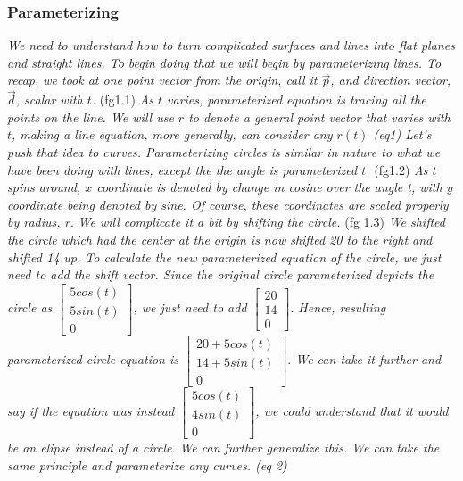 \documentclass[addpoints]{exam}
\begin{document}
\subsubsection{
Parameterizing
}
\textit{
We need to understand how to turn complicated surfaces and lines into flat planes and straight lines.
To begin doing that we will begin by parameterizing lines. 
To recap, we took at one point vector from the origin, call it $\vec{p}$, and direction vector, $\vec{d}$, scalar with $t$. 
}
(fg1.1)
\textit{
As $t$ varies, parameterized equation is tracing all the points on the line. We will use $r$ to denote a general point vector that varies with $t$, making a line equation, more generally, can consider any $r(t)$ (eq1)
Let's push that idea to curves. Parameterizing circles is similar in nature to what we have been doing with lines, except the the angle is parameterized $t$.}
(fg1.2)
\textit{
As $t$ spins around, $x$ coordinate is denoted by change in cosine over the angle t, with $y$ coordinate being denoted by sine. Of course, these coordinates are scaled properly by radius, $r.$
}
\textit{
We will complicate it a bit by shifting the circle. 
}
(fg 1.3)
\textit{
We shifted the circle which had the center at the origin is now shifted 20 to the right and shifted 14 up. To calculate the new parameterized equation of the circle, we just need to add the shift vector. Since the original circle parameterized depicts the circle as $\begin{bmatrix}
    5cos(t)\\5sin(t)\\0
\end{bmatrix}$, we just need to add $\begin{bmatrix}
    20\\14\\0
\end{bmatrix}.$ Hence, resulting parameterized circle equation is $\begin{bmatrix}
    20+5cos(t)\\
    14+5sin(t)\\
    0
\end{bmatrix}.$ We can take it further and say if the equation was instead $\begin{bmatrix}
    5cos(t)\\4sin(t)\\0
\end{bmatrix}$, we could understand that it would be an elipse instead of a circle.
}
\textit{
We can further generalize this. We can take the same principle and parameterize any curves. (eq 2)
}
\end{document}

